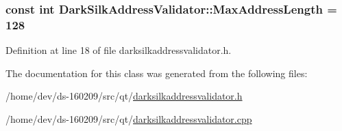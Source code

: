 \subsubsection[{Max\+Address\+Length}]{\setlength{\rightskip}{0pt plus 5cm}const int Dark\+Silk\+Address\+Validator\+::\+Max\+Address\+Length = 128\hspace{0.3cm}{\ttfamily [static]}}\label{class_dark_silk_address_validator_ade0e41d2e163261099b876a880249519}


Definition at line 18 of file darksilkaddressvalidator.\+h.



The documentation for this class was generated from the following files\+:\begin{DoxyCompactItemize}
\item 
/home/dev/ds-\/160209/src/qt/\hyperlink{darksilkaddressvalidator_8h}{darksilkaddressvalidator.\+h}\item 
/home/dev/ds-\/160209/src/qt/\hyperlink{darksilkaddressvalidator_8cpp}{darksilkaddressvalidator.\+cpp}\end{DoxyCompactItemize}
